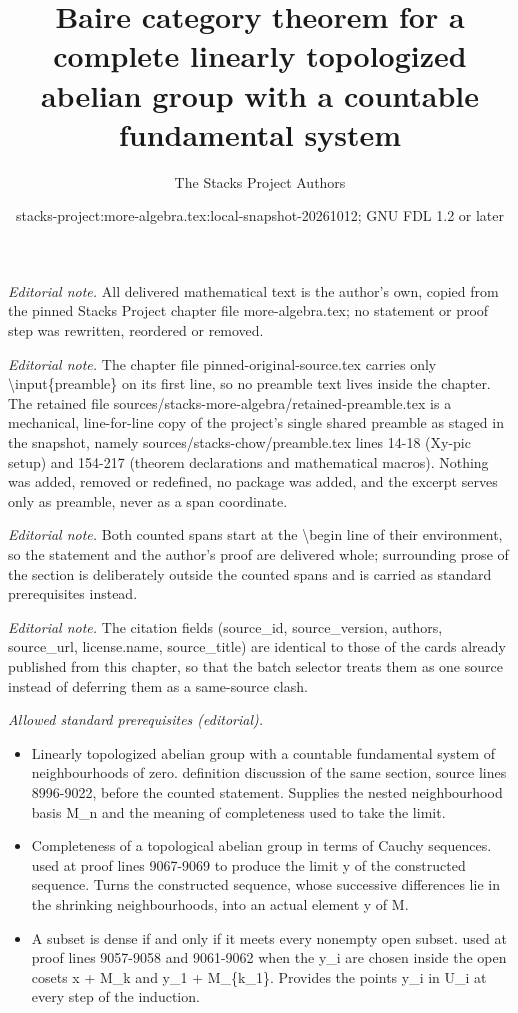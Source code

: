 \documentclass[10pt,a4paper]{amsart}
\title{Baire category theorem for a complete linearly topologized abelian group with a countable fundamental system}
\author{The Stacks Project Authors}
\date{stacks-project:more-algebra.tex:local-snapshot-20261012; GNU FDL 1.2 or later}
\theoremstyle{plain}
\theoremstyle{definition}
\theoremstyle{remark}
\numberwithin{equation}{subsection}
\begin{document}
\maketitle
\setcounter{subsection}{1}
\noindent\textit{Editorial note.} All delivered mathematical text is the author's own, copied from the pinned Stacks Project chapter file more-algebra.tex; no statement or proof step was rewritten, reordered or removed.\par\medskip
\noindent\textit{Editorial note.} The chapter file pinned-original-source.tex carries only \textbackslash{}input\{preamble\} on its first line, so no preamble text lives inside the chapter. The retained file sources/stacks-more-algebra/retained-preamble.tex is a mechanical, line-for-line copy of the project's single shared preamble as staged in the snapshot, namely sources/stacks-chow/preamble.tex lines 14-18 (Xy-pic setup) and 154-217 (theorem declarations and mathematical macros). Nothing was added, removed or redefined, no package was added, and the excerpt serves only as preamble, never as a span coordinate.\par\medskip
\noindent\textit{Editorial note.} Both counted spans start at the \textbackslash{}begin line of their environment, so the statement and the author's proof are delivered whole; surrounding prose of the section is deliberately outside the counted spans and is carried as standard prerequisites instead.\par\medskip
\noindent\textit{Editorial note.} The citation fields (source\_id, source\_version, authors, source\_url, license.name, source\_title) are identical to those of the cards already published from this chapter, so that the batch selector treats them as one source instead of deferring them as a same-source clash.\par\medskip
\noindent\textit{Allowed standard prerequisites (editorial).}\begin{itemize}
\item Linearly topologized abelian group with a countable fundamental system of neighbourhoods of zero. definition discussion of the same section, source lines 8996-9022, before the counted statement. Supplies the nested neighbourhood basis M\_n and the meaning of completeness used to take the limit.
\item Completeness of a topological abelian group in terms of Cauchy sequences. used at proof lines 9067-9069 to produce the limit y of the constructed sequence. Turns the constructed sequence, whose successive differences lie in the shrinking neighbourhoods, into an actual element y of M.
\item A subset is dense if and only if it meets every nonempty open subset. used at proof lines 9057-9058 and 9061-9062 when the y\_i are chosen inside the open cosets x + M\_k and y\_1 + M\_\{k\_1\}. Provides the points y\_i in U\_i at every step of the induction.
\end{itemize}\medskip
\end{document}
